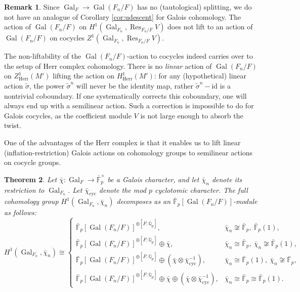 \documentclass[11pt]{amsart}
\newtheorem{thm}{Theorem}[section]
\theoremstyle{definition}
\newtheorem{remark}[thm]{Remark}
\newcommand{\Q}{\mathbb{Q}}
\newcommand{\F}{\mathbb{F}}
\newcommand{\bfE}{\mathbf{E}}
\newcommand{\cyc}{{\operatorname{cyc}}}
\DeclareMathOperator{\Gal}{Gal}
\DeclareMathOperator{\Res}{Res}
\newcommand{\Herr}{\mathrm{Herr}}
\begin{document}
\begin{remark}
Since $\Gal_F\to \Gal(F_n/F)$
has no (tautological)
splitting,
we do not have an analogue
of Corollary \ref{cor:udescent}
for Galois cohomology.
The action of $\Gal(F_n/F)$
on
$H^1(\Gal_{F_n},
\Res_{F_n/F}V)$
does not lift to an action
of $\Gal(F_n/F)$
on cocycles
$Z^1(\Gal_{F_n},
\Res_{F_n/F}V)$.

The non-liftability of the
$\Gal(F_n/F)$-action
to cocycles indeed carries
over to the setup of
Herr complex cohomology.
There is no \textit{linear}
action of $\Gal(F_n/F)$
on $Z^1_{\Herr}(M')$
lifting the action on
$H^1_{\Herr}(M')$:
for any (hypothetical) linear action
$\tilde{\sigma}$,
the power $\tilde{\sigma}^n$
will never be the identity map,
rather
$\tilde{\sigma}^n - \mathrm{id}$
is a nontrivial coboundary.
If one systematically
corrects this coboundary,
one will always end up with
a semilinear action.
Such a correction is
impossible to do for
Galois cocycles,
as the coefficient module $V$
is not large enough
to absorb the twist.

One of the advantages of
the Herr complex is that
it enables us to lift linear
(inflation-restriction)
Galois actions on cohomology
groups to semilinear actions
on cocycle groups.
\end{remark}


\begin{thm}
\rm
Let $\bar\chi:\Gal_F\to\bar{\F}_p^\times$ be a Galois character, and let
$\bar\chi_n$ denote its restriction to $\Gal_{F_n}$. Let $\bar\chi_{\cyc}$
denote the mod $p$ cyclotomic character. The full cohomology group $H^1(\Gal_{F_n},\bar\chi_n)$ decomposes
as an $\bar{\F}_p[\Gal(F_n/F)]$-module as follows:
\[
H^1(\Gal_{F_n},\bar\chi_n)
\cong
\begin{cases}
\bar{\F}_p[\Gal(F_n/F)]^{\oplus [F:\Q_p]},
& \bar\chi_n\not\cong\bar{\F}_p,\ \bar{\F}_p(1),
\\[4pt]
\bar{\F}_p[\Gal(F_n/F)]^{\oplus [F:\Q_p]} \oplus \bar\chi,
& \bar\chi_n\cong\bar{\F}_p,\ \bar\chi_n\not\cong\bar{\F}_p(1),
\\[4pt]
\bar{\F}_p[\Gal(F_n/F)]^{\oplus [F:\Q_p]} \oplus 
(\bar\chi\otimes\bar\chi_{\cyc}^{-1}),
& \bar\chi_n\cong\bar{\F}_p(1),\ \bar\chi_n\not\cong\bar{\F}_p,
\\[4pt]
\bar{\F}_p[\Gal(F_n/F)]^{\oplus [F:\Q_p]} \oplus \bar\chi \oplus 
(\bar\chi\otimes\bar\chi_{\cyc}^{-1}),
& \bar\chi_n\cong\bar{\F}_p \cong \bar{\F}_p(1).
\end{cases}
\]
\label{thm:h1-structure}
\end{thm}
\end{document}
